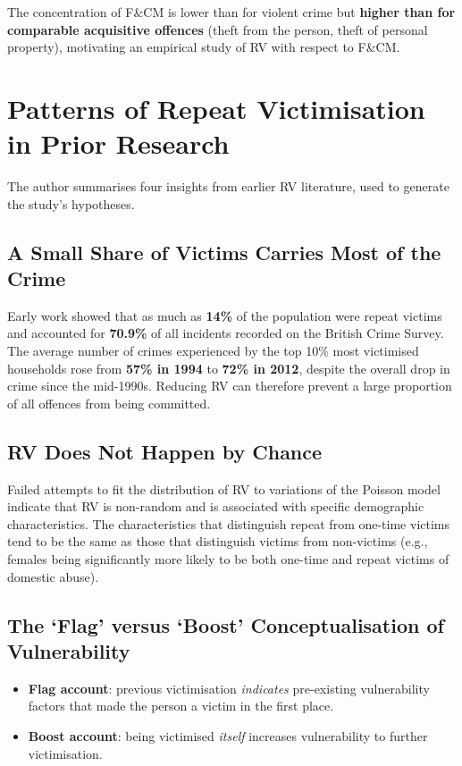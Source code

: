 \documentclass[11pt,a4paper,openany]{report}
\theoremstyle{definition}
\theoremstyle{plain}
\theoremstyle{remark}
\begin{document}
The concentration of F\&CM is lower than for violent crime but \textbf{higher than for comparable acquisitive offences} (theft from the person, theft of personal property), motivating an empirical study of RV with respect to F\&CM.

\section{Patterns of Repeat Victimisation in Prior Research}

The author summarises four insights from earlier RV literature, used to generate the study's hypotheses.

\subsection{A Small Share of Victims Carries Most of the Crime}

Early work showed that as much as \textbf{14\%} of the population were repeat victims and accounted for \textbf{70.9\%} of all incidents recorded on the British Crime Survey. The average number of crimes experienced by the top 10\% most victimised households rose from \textbf{57\% in 1994} to \textbf{72\% in 2012}, despite the overall drop in crime since the mid-1990s. Reducing RV can therefore prevent a large proportion of all offences from being committed.

\subsection{RV Does Not Happen by Chance}

Failed attempts to fit the distribution of RV to variations of the Poisson model indicate that RV is non-random and is associated with specific demographic characteristics. The characteristics that distinguish repeat from one-time victims tend to be the same as those that distinguish victims from non-victims (e.g., females being significantly more likely to be both one-time and repeat victims of domestic abuse).

\subsection{The `Flag' versus `Boost' Conceptualisation of Vulnerability}

\begin{itemize}
    \item \textbf{Flag account}: previous victimisation \emph{indicates} pre-existing vulnerability factors that made the person a victim in the first place.
    \item \textbf{Boost account}: being victimised \emph{itself} increases vulnerability to further victimisation.
\end{itemize}
\end{document}
